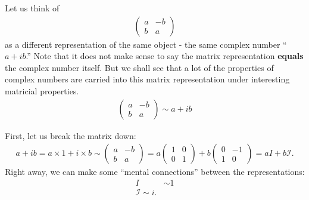 \documentclass{article}
\theoremstyle{definition}
\begin{document}
Let us think of 
\begin{align*}
\begin{pmatrix}
a & -b\\
b & a
\end{pmatrix}
\end{align*}
as a different representation of the same object - the same complex number ``$a+ib$.'' Note that it does not make sense to say the matrix representation \textbf{equals} the complex number itself. But we shall see that a lot of the properties of complex numbers are carried into this matrix representation under interesting matricial properties.
\begin{align*}
\boxed{\begin{pmatrix}
	a & -b\\
	b & a
	\end{pmatrix}
\sim a + ib}
\end{align*}

First, let us break the matrix down:
\begin{align*}
a+ib = a\times 1 + i \times b \sim \begin{pmatrix}
a & -b \\
b & a
\end{pmatrix} 
= 
a\begin{pmatrix}
1 & 0\\
0 & 1
\end{pmatrix}
+
b\begin{pmatrix}
0 & -1\\
1 & 0
\end{pmatrix}
= aI + b\mathcal{I}.
\end{align*}
Right away, we can make some ``mental connections'' between the representations:
\begin{align*}
I &\sim 1\\
\mathcal{I} \sim i.
\end{align*}
\end{document}
